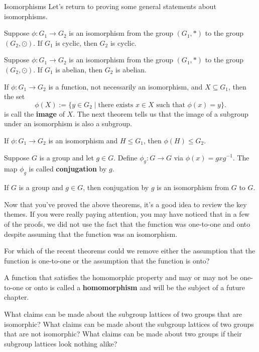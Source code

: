 \begin{section}{Isomorphisms}
Let's return to proving some general statements about isomorphisms.

\begin{theorem}
Suppose $\phi:G_1\to G_2$ is an isomorphism from the group $(G_1,*)$ to the group $(G_2,\odot)$. If $G_1$ is cyclic, then $G_2$ is cyclic.
\end{theorem}

\begin{theorem}
Suppose $\phi:G_1\to G_2$ is an isomorphism from the group $(G_1,*)$ to the group $(G_2,\odot)$. If $G_1$ is abelian, then $G_2$ is abelian.
\end{theorem}

If $\phi:G_1\to G_2$ is a function, not necessarily an isomorphism, and $X\subseteq G_1$, then the set
\[
\phi(X):=\{y\in G_2\mid \text{there exists } x\in X\text{ such that }\phi(x)=y\}. 
\]
is call the \textbf{image} of $X$.  The next theorem tells us that the image of a subgroup under an isomorphism is also a subgroup.

\begin{theorem}
If $\phi:G_1\to G_2$ is an isomorphism and $H\leq G_1$, then $\phi(H)\leq G_2$.
\end{theorem}

Suppose $G$ is a group and let $g\in G$.  Define $\phi_g:G\to G$ via $\phi(x)=gxg^{-1}$.  The map $\phi_g$ is called \textbf{conjugation} by $g$.

\begin{theorem}
If $G$ is a group and $g\in G$, then conjugation by $g$ is an isomorphism from $G$ to $G$.
\end{theorem}

Now that you've proved the above theorems, it's a good idea to review the key themes.  If you were really paying attention, you may have noticed that in a few of the proofs, we did not use the fact that the function was one-to-one and onto despite assuming that the function was an isomorphism.

\begin{problem}
For which of the recent theorems could we remove either the assumption that the function is one-to-one or the assumption that the function is onto?
\end{problem}

A function that satisfies the homomorphic property and may or may not be one-to-one or onto is called a \textbf{homomorphism} and will be the subject of a future chapter.

\begin{problem}
What claims can be made about the subgroup lattices of two groups that are isomorphic? What claims can be made about the subgroup lattices of two groups that are not isomorphic?  What claims can be made about two groups if their subgroup lattices look nothing alike?
\end{problem}

\end{section}